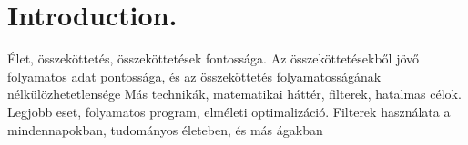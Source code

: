 \chapter{Introduction.}
\label{chap:introduction}

Élet, összeköttetés, összeköttetések fontossága. Az összeköttetésekből jövő folyamatos adat pontossága, és az összeköttetés folyamatosságának nélkülözhetetlensége
Más technikák, matematikai háttér, filterek, hatalmas célok. Legjobb eset, folyamatos program, elméleti optimalizáció. Filterek használata a mindennapokban, tudományos életeben, és más ágakban

